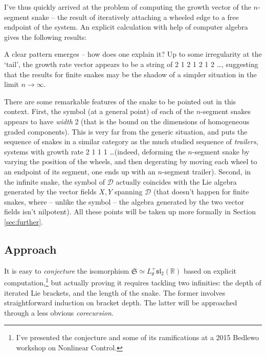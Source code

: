 \documentclass{article}
\def\fsl{\mathfrak{sl}}
\def\fS{\mathfrak{S}}
\def\sD{\mathscr{D}}
\def\RR{\mathbb{R}}
\theoremstyle{definition}
\begin{document}
I've thus quickly arrived at the problem of computing the growth vector of
the $n$-segment snake -- the result of iteratively attaching a wheeled edge  
to a free endpoint of the system. An explicit calculation with help of computer
algebra gives the following results:
\begin{center}\end{center}
A clear pattern emerges -- how does one explain it?
Up to some irregularity at the `tail', the growth rate
vector appears to be a string of 2 1 2 1 2 1 2 \dots,
suggesting that the results for finite snakes may be the shadow
of a simpler situation in the limit $n\to\infty$. 

There are some remarkable features of the snake to be pointed out in this context.
First, the symbol (at a general point) of each of the $n$-segment
snakes appears to have \emph{width} 2 (that is the bound on
the dimensions of homogeneous graded components). This is
very far from the generic situation, and puts the sequence
of snakes in a similar category as the much studied sequence
of \emph{trailers}, systems with growth rate 2 1 1 1 \dots (indeed, deforming the $n$-segment snake
by varying the position of the wheels, and then degerating by moving each wheel to
an endpoint of its segment, one ends up with an $n$-segment trailer). 
Second, in the infinite snake, the symbol of $\sD$ actually coincides with
the Lie algebra generated by the vector fields $X, Y$ spanning $\sD$ (that doesn't
happen for finite snakes, where -- unlike the symbol -- the algebra generated
by the two vector fields isn't nilpotent).
All these points will be taken up more formally in Section \ref{sec:further}.

\subsection{Approach}
It is easy to \emph{conjecture} the isomorphism $\fS \simeq L^+_\theta\fsl_2(\RR)$
based on explicit computation,\footnote{I've presented the conjecture and some of its
ramifications at a 2015 Bedlewo workshop on Nonlinear Control.}
but actually proving it requires tackling two infinities: the depth of iterated Lie brackets,
and the length of the snake.
The former involves straightforward induction on bracket depth.
The latter will be approached through a less obvious \emph{corecursion}.
\end{document}
